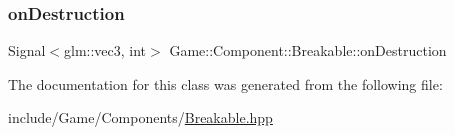 \mbox{\label{class_game_1_1_component_1_1_breakable_ac0ae61567c2ac3615929e42bdb0ed735}} 
\subsubsection{\texorpdfstring{on\+Destruction}{onDestruction}}
{\footnotesize\ttfamily Signal$<$glm\+::vec3, int$>$ Game\+::\+Component\+::\+Breakable\+::on\+Destruction}



The documentation for this class was generated from the following file\+:\begin{DoxyCompactItemize}
\item 
include/\+Game/\+Components/\mbox{\hyperlink{_breakable_8hpp}{Breakable.\+hpp}}\end{DoxyCompactItemize}
